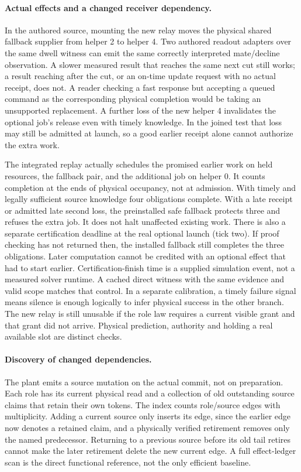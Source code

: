 \documentclass[11pt]{article}
\begin{document}
\paragraph{Actual effects and a changed receiver dependency.}
In the authored source, mounting the new relay moves the physical
shared fallback supplier from helper 2 to helper 4. Two authored readout adapters over the same dwell witness
can emit the same correctly interpreted
mate/decline observation. A slower measured result that reaches the
same next cut still works; a result reaching after the cut, or an
on-time update request with no actual receipt, does not. A reader
checking a fast response but accepting a queued command as the
corresponding physical completion would be taking an unsupported
replacement. A further loss of the new helper 4 invalidates the
optional job's release even with timely knowledge. In the joined
test that loss may still be admitted at launch, so a good earlier
receipt alone cannot authorize the extra work.

The integrated replay actually schedules the promised earlier work
on held resources, the fallback pair, and the additional job on
helper 0. It counts completion at the ends of physical occupancy,
not at admission. With timely and legally sufficient source knowledge
four obligations complete. With a late receipt or admitted late
second loss, the preinstalled safe fallback protects three and
refuses the extra job. It does not halt unaffected existing work.
There is also a separate certification deadline at the real optional
launch (tick two). If proof checking has not returned then, the
installed fallback still completes the three obligations. Later
computation cannot be credited with an optional effect that had to
start earlier. Certification-finish time is a supplied simulation
event, not a measured solver runtime. A cached direct witness with
the same evidence and valid scope matches that control.
In a separate calibration, a timely failure signal means silence
is enough logically to infer physical success in the other branch.
The new relay is still unusable if the role law requires a current
visible grant and that grant did not arrive. Physical prediction,
authority and holding a real available slot are distinct checks.

\paragraph{Discovery of changed dependencies.}
The plant emits a source mutation on the actual commit, not on
preparation. Each role has its current physical read and a collection
of old outstanding source claims that retain their own tokens. The
index counts role/source edges with multiplicity. Adding a current
source only inserts its edge, since the earlier edge now denotes
a retained claim, and a physically verified retirement removes only
the named predecessor. Returning to a previous source before its
old tail retires cannot make the later retirement delete the new
current edge. A full effect-ledger scan is the direct functional
reference, not the only efficient baseline.
\end{document}
